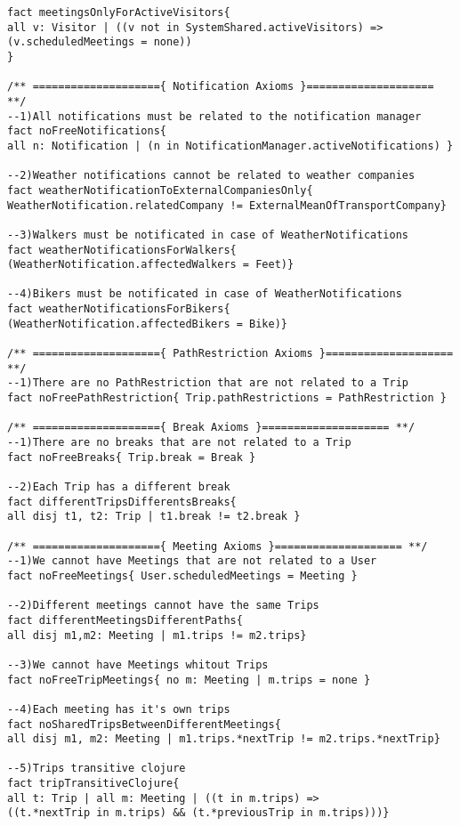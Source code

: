\documentclass[a4paper,leqno]{book}
\begin{document}
\begin{lstlisting}
fact meetingsOnlyForActiveVisitors{
all v: Visitor | ((v not in SystemShared.activeVisitors) => 
(v.scheduledMeetings = none))
}

/** ===================={ Notification Axioms }==================== **/
--1)All notifications must be related to the notification manager
fact noFreeNotifications{ 
all n: Notification | (n in NotificationManager.activeNotifications) }

--2)Weather notifications cannot be related to weather companies
fact weatherNotificationToExternalCompaniesOnly{
WeatherNotification.relatedCompany != ExternalMeanOfTransportCompany}

--3)Walkers must be notificated in case of WeatherNotifications
fact weatherNotificationsForWalkers{	
(WeatherNotification.affectedWalkers = Feet)}

--4)Bikers must be notificated in case of WeatherNotifications
fact weatherNotificationsForBikers{	
(WeatherNotification.affectedBikers = Bike)}

/** ===================={ PathRestriction Axioms }==================== **/
--1)There are no PathRestriction that are not related to a Trip
fact noFreePathRestriction{ Trip.pathRestrictions = PathRestriction }

/** ===================={ Break Axioms }==================== **/
--1)There are no breaks that are not related to a Trip
fact noFreeBreaks{ Trip.break = Break }

--2)Each Trip has a different break
fact differentTripsDifferentsBreaks{ 
all disj t1, t2: Trip | t1.break != t2.break }

/** ===================={ Meeting Axioms }==================== **/
--1)We cannot have Meetings that are not related to a User
fact noFreeMeetings{ User.scheduledMeetings = Meeting }

--2)Different meetings cannot have the same Trips
fact differentMeetingsDifferentPaths{
all disj m1,m2: Meeting | m1.trips != m2.trips}

--3)We cannot have Meetings whitout Trips
fact noFreeTripMeetings{ no m: Meeting | m.trips = none }

--4)Each meeting has it's own trips
fact noSharedTripsBetweenDifferentMeetings{
all disj m1, m2: Meeting | m1.trips.*nextTrip != m2.trips.*nextTrip}

--5)Trips transitive clojure
fact tripTransitiveClojure{
all t: Trip | all m: Meeting | ((t in m.trips) => 
((t.*nextTrip in m.trips) && (t.*previousTrip in m.trips)))}


\end{lstlisting}
\end{document}
